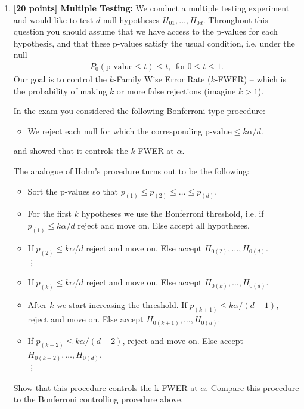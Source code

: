 \documentclass[12pt]{article}
\begin{document}
\begin{enumerate}
\item {\bf [20 points] Multiple Testing: } We conduct a multiple testing experiment and would like to test $d$ null hypotheses $H_{01}, \ldots, H_{0d}$. 
Throughout this question you should assume that we have access to the p-values for each hypothesis, and that these p-values satisfy the usual condition, i.e. under the null
\begin{align*}
P_0(\text{p-value} \leq t) \leq t,~~\text{for}~0 \leq t \leq 1.
\end{align*}
Our goal is to control the $k$-Family Wise Error Rate ($k$-FWER) -- which 
is the probability of making $k$ or more false rejections (imagine $k > 1$). 

In the exam you considered the following Bonferroni-type procedure:
\begin{itemize}
\item We reject each null for which the corresponding $\text{p-value} \leq k\alpha/d$. 
\end{itemize}
and showed that it controls the $k$-FWER at $\alpha$. 



The analogue of Holm's procedure turns out to be the following:
\begin{itemize}
\item Sort the p-values so that $p_{(1)} \leq p_{(2)} \leq \ldots \leq p_{(d)}.$
\item For the first $k$ hypotheses we use the Bonferroni threshold, i.e. if $p_{(1)} \leq  k\alpha/d$ reject and move on. Else accept all hypotheses.
\item If $p_{(2)} \leq  k\alpha/d$ reject and move on. Else accept $H_{0(2)}, \ldots, H_{0(d)}$. \\
\vdots
\item If $p_{(k)} \leq  k\alpha/d$ reject and move on. Else accept $H_{0(k)}, \ldots, H_{0(d)}$.
\item After $k$ we start increasing the threshold. If $p_{(k+1)} \leq k\alpha/(d - 1)$, reject and move on. Else accept $H_{0(k+1)}, \ldots, H_{0(d)}$.
\item  If $p_{(k+2)} \leq k\alpha/(d - 2)$, reject and move on. Else accept $H_{0(k+2)}, \ldots, H_{0(d)}$. \\
\vdots
\end{itemize}
Show that this procedure controls the k-FWER at $\alpha$. Compare this procedure to the Bonferroni controlling procedure above.



\end{enumerate}
\end{document}

